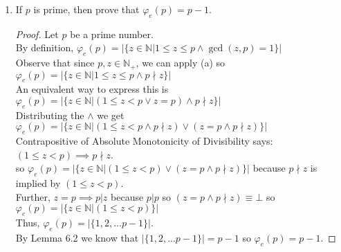 \documentclass{article}
\newcommand{\naturals}{\mathbb{N}}
\newcommand{\divides}{\:\mathbb{|}\: }
\newcommand{\notdivides}{\nmid}
\newcommand{\integers}{\mathbb{Z}}
\begin{document}
\begin{enumerate}
\begin{enumerate}
\begin{proof}
\begin{enumerate}
                \item []$p \divides m \implies \gcd(p^k, m) \neq 1$\\
                Assume $p \divides m$. Observe $p\cdot p^{k-1}=p^k$. When $k \in \naturals_+$,  $p^{k-1} \in \integers$, so we know that $p \divides p^k$. Thus since  $p \divides p^k \land p \divides m$, we can conclude that $p \divides \gcd(p^k,m)$. Towards a contradiction, assume that $\gcd(p^k, m) = 1$. Putting those two facts together implies that $p \divides 1$, so $p \leq 1$. However, $p > 1$ since p is prime. $\lightning$. Therefore, $\gcd(p^k, m) \neq 1$.
            \end{enumerate}
            Since we have shown that $\gcd(p^k, m) \neq 1 \implies p \divides m$ and $p \divides m \implies \gcd(p^k, m) \neq 1$ by biconditional disintegration we know $\gcd(p^k, m) \neq 1 \iff p \divides m$.
        \end{proof}
      \item
        If $p$ is prime, then prove that $\varphi_e(p) = p - 1$.
        \begin{proof}
            Let $p$ be a prime number.\\ 
            By definition, $\varphi_e(p)=|\{z \in \naturals| 1 \leq z \leq p \land \gcd(z,p)=1\}|$\\
            Observe that since $p,z \in \naturals_+$, we can apply (a) so $\varphi_e(p)=|\{z \in \naturals| 1 \leq z \leq p \land p \notdivides z\}|$\\
            An equivalent way to express this is $\varphi_e(p)=|\{z \in \naturals| (1 \leq z < p \lor z = p) \land p \notdivides z\}|$\\
            Distributing the $\land$ we get $\varphi_e(p)=|\{z \in \naturals| (1 \leq z < p \land p \notdivides z) \lor (z = p \land p \notdivides z) \}|$\\
            Contrapositive of Absolute Monotonicity of Divisibility says: $(1 \leq z < p) \implies p \notdivides z$.\\
            so $\varphi_e(p)=|\{z \in \naturals| (1 \leq z < p) \lor (z = p \land p \notdivides z) \}|$ because $p \notdivides z$ is implied by $(1 \leq z < p)$.\\
            Further, $z=p \implies p|z$ because $p|p$ so $(z = p \land p \notdivides z)\equiv \bot$ so $\varphi_e(p)=|\{z \in \naturals| (1 \leq z < p)\}|$\\
            Thus, $\varphi_e(p)=|\{1,2,...p-1\}|$.\\
            By Lemma 6.2 we know that $|\{1,2,...p-1\}|=p-1$ so $\varphi_e(p) = p - 1$.

\end{proof}
\end{enumerate}
\end{enumerate}
\end{document}
